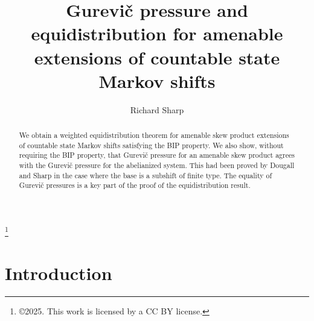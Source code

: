 \documentclass[11pt,letterpaper]{amsart}
\theoremstyle{definition}
\numberwithin{equation}{section}
\numberwithin{theorem}{section}
\begin{document}
 \title[Gurevi\v{c} pressure and equidistribution]%
{Gurevi\v{c} pressure and equidistribution for amenable extensions of countable state Markov shifts} 



\author{Richard Sharp} 
\address{Mathematics Institute, University of Warwick,
Coventry CV4 7AL, U.K.}




\thanks{\copyright 2025. This work is licensed by a CC BY license.}



\keywords{}



\begin{abstract}
We obtain a weighted equidistribution theorem for amenable skew product extensions of 
countable state Markov shifts satisfying the BIP property. We also show, without requiring the BIP property, that 
Gurevi\v{c} pressure for an amenable skew product agrees with the Gurevi\v{c} pressure for the abelianized system.
This had been proved by Dougall and Sharp in the case where the base is a subshift of finite type.
The equality of Gurevi\v{c} pressures is a key part of the proof of the equidistribution result.
\end{abstract}

\maketitle

%
%
%
%
%
%
%
%
%

\section{Introduction}
\end{document}
